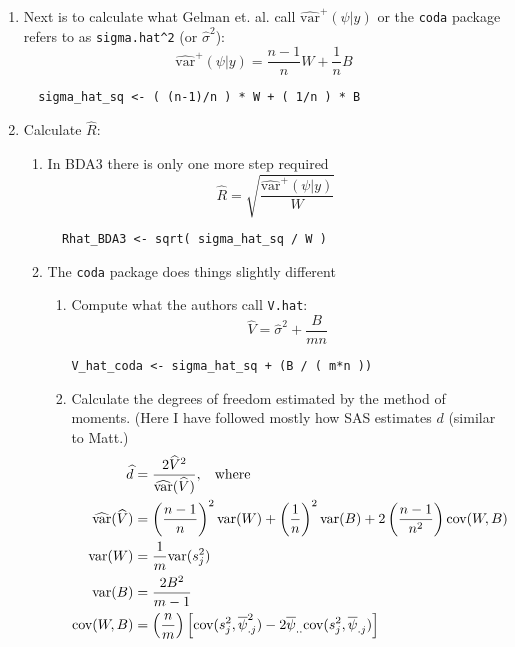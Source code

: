 \documentclass[11pt]{article}\usepackage[]{graphicx}\usepackage[]{color}
\begin{document}
\begin{enumerate}
\item Next is to calculate what Gelman et. al. call $\widehat{\text{var}}^+(\psi|y)$ or the \verb|coda| package refers to as \verb|sigma.hat^2| (or $\widehat{\sigma}^2$):
{\color{blue} 
$$\widehat{\text{var}}^+(\psi|y) = \frac{n-1}{n}W + \frac{1}{n}B$$
}\vspace{-0.7cm}
{\color{red} 
\begin{verbatim}
  sigma_hat_sq <- ( (n-1)/n ) * W + ( 1/n ) * B
\end{verbatim}
}

\item Calculate $\widehat{R}$:
  \begin{enumerate}
  \item In BDA3 there is only one more step required
{\color{blue}
$$\widehat{R} = \sqrt{\frac{\widehat{\text{var}}^+(\psi|y)}{W}}$$
}\vspace{-0.7cm}
{\color{red}
\begin{verbatim}
  Rhat_BDA3 <- sqrt( sigma_hat_sq / W )
\end{verbatim}
}
  \item The \verb|coda| package does things slightly different
    \begin{enumerate}
    \item Compute what the authors call \verb|V.hat|:
{\color{blue}
$$\widehat{V} = \widehat{\sigma}^2 + \frac{B}{mn}$$
}    \vspace{-0.5cm}
{\color{red}
\begin{verbatim}
V_hat_coda <- sigma_hat_sq + (B / ( m*n ))
\end{verbatim}
}
    \item Calculate the degrees of freedom estimated by the method of moments. (Here I have followed mostly how SAS estimates $d$ (similar to Matt.)
{\color{blue}
\begin{equation*}
\begin{split}
\widehat{d} & = \frac{2\widehat{V}^2}{\widehat{\text{var}}(\widehat{V})}, \hspace{0.3cm} \text{where}\\
\widehat{\text{var}}(\widehat{V}) & = \left(\frac{n-1}{n}\right)^2\text{var}(W) + \left(\frac{1}{n}\right)^2\text{var}(B) + 2\left(\frac{n-1}{n^2}\right)\text{cov}(W,B)\\
\text{var}(W) & = \frac{1}{m}\text{var}(s_j^2)\\
\text{var}(B) & = \frac{2B^2}{m-1}\\
\text{cov}(W,B) & = \left(\frac{n}{m}\right)\left[\text{cov}(s_j^2,\overline{\psi}_{.j}^2) - 2\overline{\psi}_{..}\text{cov}(s_j^2,\overline{\psi}_{.j})\right]

\end{split}
\end{equation*}}
\end{enumerate}
\end{enumerate}
\end{enumerate}
\end{document}
